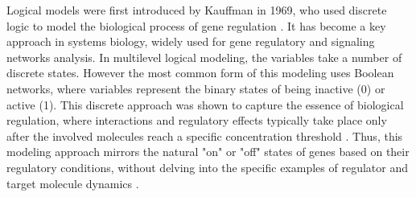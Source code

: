 Logical models were first introduced by Kauffman in 1969, who used discrete logic to model the biological process of gene 
regulation \cite{kauffman1969metabolic}.  It has become a key approach in systems biology, widely used for gene regulatory
 and signaling networks analysis. 
In multilevel logical modeling, the variables take a number of discrete states. However the most common form of this modeling 
uses Boolean networks, where variables represent the binary states of being inactive (0) or active (1). 
This discrete approach was shown to capture the essence of biological regulation, where interactions and regulatory 
effects typically take place only after the involved molecules reach a specific concentration threshold \cite{glass1972co}. 
Thus, this modeling approach mirrors the natural "on" or "off" states of genes based on their regulatory conditions, 
without delving into the specific examples of regulator and target molecule dynamics 
\cite{thomas1991regulatory,samaga2013modeling}.


